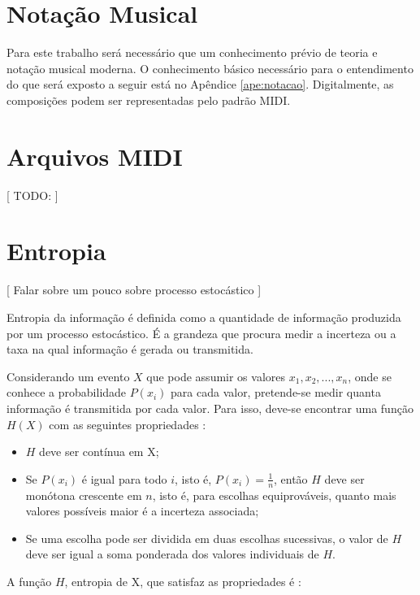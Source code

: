 \section{Notação Musical}

Para este trabalho será necessário que um conhecimento prévio de teoria e notação musical moderna. O conhecimento básico necessário para o entendimento do que será exposto a seguir está no Apêndice \ref{ape:notacao}.
Digitalmente, as composições podem ser representadas pelo padrão MIDI.

\section{Arquivos MIDI}

[ TODO: ]



\section{Entropia}

[ Falar sobre um pouco sobre processo estocástico ]

Entropia da informação é definida como a quantidade de informação produzida por um processo estocástico. É a grandeza que procura medir a incerteza ou a taxa na qual informação é gerada ou transmitida.

Considerando um evento $X$ que pode assumir os valores ${x_1, x_2, ..., x_n}$, onde se conhece a probabilidade $P(x_i)$ para cada valor, pretende-se medir quanta informação é transmitida por cada valor. Para isso, deve-se encontrar uma função $H(X)$ com as seguintes propriedades \cite{shannon}:

\begin{itemize}
    \item $H$ deve ser contínua em X;
    \item Se $P(x_i)$ é igual para todo $i$, isto é, $P(x_i) = \frac{1}{n}$, então $H$ deve ser monótona crescente em $n$, isto é, para escolhas equiprováveis, quanto mais valores possíveis maior é a incerteza associada;
    \item Se uma escolha pode ser dividida em duas escolhas sucessivas, o valor de $H$ deve ser igual a soma ponderada dos valores individuais de $H$. 
\end{itemize}

A função $H$, entropia de X, que satisfaz as propriedades é \cite{shannon}:

